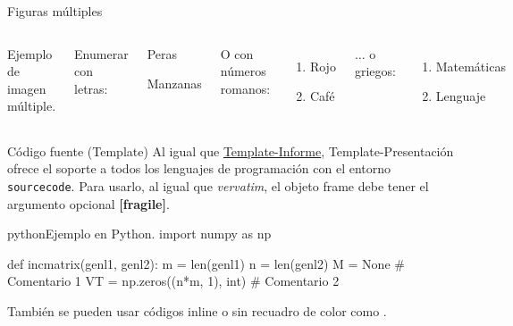 
\begin{frame}{Figuras múltiples}
	\begin{columns}[c]
		\begin{images}{Ejemplo de imagen múltiple.}
			\imagesnewline
		\end{images}
		
		
		Enumerar con letras:
		
		\begin{enumeratebf}[label=\alph*) ] %
			\item Peras
			\item Manzanas
		\end{enumeratebf}
		
		O con números romanos:
		
		\begin{enumerate}[label=\roman*) ]
			\item Rojo
			\item Café
		\end{enumerate}
		
		$\ldots$ o griegos:
		
		\begin{enumerate}[label=\greek*) ]
			\item Matemáticas
			\item Lenguaje
		\end{enumerate}
	\end{columns}
\end{frame}


\begin{frame}[fragile]{Código fuente (Template)}
	Al igual que \href{https://latex.ppizarror.com/informe}{Template-Informe}, Template-Presentación ofrece el soporte a todos los lenguajes de programación con el entorno \texttt{sourcecode}. Para usarlo, al igual que \textit{vervatim}, el objeto frame debe tener el argumento opcional \textbf{[fragile]}.

\begin{sourcecode}{python}{Ejemplo en Python.}
import numpy as np

def incmatrix(genl1, genl2):
	m = len(genl1)
	n = len(genl2)
	M = None # Comentario 1
	VT = np.zeros((n*m, 1), int) # Comentario 2
\end{sourcecode}
	
	También se pueden usar códigos inline  o sin recuadro de color como .
\end{frame}

